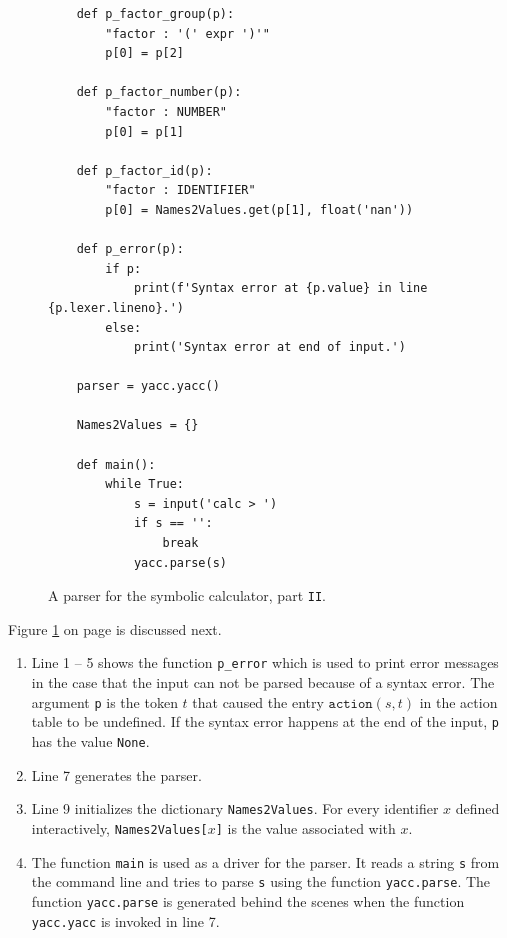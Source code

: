 \begin{figure}[!ht]
\centering
\begin{verbatim}
    def p_factor_group(p):
        "factor : '(' expr ')'"
        p[0] = p[2]
        
    def p_factor_number(p):
        "factor : NUMBER"
        p[0] = p[1]

    def p_factor_id(p):
        "factor : IDENTIFIER"
        p[0] = Names2Values.get(p[1], float('nan'))
                
    def p_error(p):
        if p:
            print(f'Syntax error at {p.value} in line {p.lexer.lineno}.')
        else:
            print('Syntax error at end of input.')
        
    parser = yacc.yacc()

    Names2Values = {}
    
    def main():
        while True:
            s = input('calc > ')
            if s == '':
                break
            yacc.parse(s)
\end{verbatim}
\vspace*{-0.3cm}
\caption{A parser for the symbolic calculator, part \texttt{II}.}
\label{fig:Symbolic-Calculator.ipynb:yacc2}
\end{figure}
\FloatBarrier

\noindent
Figure \ref{fig:Symbolic-Calculator.ipynb:yacc2} on page \pageref{fig:Symbolic-Calculator.ipynb:yacc2}
is discussed next.
\begin{enumerate}
\item Line 1 -- 5 shows the function \texttt{p\_error} which is used to print error messages in the case that
      the input can not be parsed because of a syntax error.  The argument \texttt{p} is the token $t$ that
      caused the entry $\texttt{action}(s, t)$ in the action table to be undefined.
      If the syntax error happens at the end of the input, \texttt{p} has the value \texttt{None}.
\item Line 7 generates the parser.
\item Line 9 initializes the dictionary \texttt{Names2Values}.  For every identifier $x$ defined interactively,
      \texttt{Names2Values[$x$]} is the value associated with $x$.
\item The function \texttt{main} is used as a driver for the parser.  It reads a string \texttt{s}
      from the command line and tries to parse \texttt{s} using the function \texttt{yacc.parse}.
      The function \texttt{yacc.parse} is generated behind the scenes when the function \texttt{yacc.yacc} is
      invoked in line 7. 
\end{enumerate}

